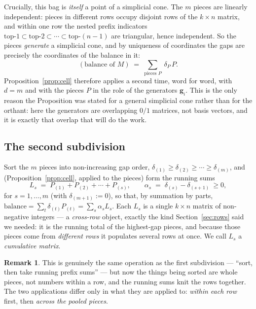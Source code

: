 \documentclass[11pt,a4paper]{article}
\theoremstyle{definition}
\newtheorem{remark}[definition]{Remark}
\theoremstyle{plain}
\newcommand{\bvec}[1]{\mathbf{#1}}
\begin{document}
Crucially, this bag is \emph{itself} a point of a simplicial cone. The $m$
pieces are linearly independent: pieces in different rows occupy disjoint rows
of the $k\times n$ matrix, and within one row the nested prefix indicators
$\text{top-}1\subset\text{top-}2\subset\cdots\subset\text{top-}(n-1)$ are
triangular, hence independent. So the pieces \emph{generate} a simplicial cone,
and by uniqueness of coordinates the gaps are precisely the coordinates of the
balance in it:
\[
   (\text{balance of }M)\;=\;\sum_{\text{pieces }P}\ \delta_P\, P .
\]
Proposition~\ref{prop:cell} therefore applies a second time, word for word,
with $d=m$ and with the pieces $P$ in the role of the generators $\bvec g_i$.
This is the only reason the Proposition was stated for a general simplicial
cone rather than for the orthant: here the generators are overlapping $0/1$
matrices, not basis vectors, and it is exactly that overlap that will do the
work.

\subsection{The second subdivision}

Sort the $m$ pieces into non-increasing gap order, $\delta_{(1)}\ge\delta_{(2)}
\ge\cdots\ge\delta_{(m)}$, and (Proposition~\ref{prop:cell}, applied to the
pieces) form the running sums
\begin{equation}\label{eq:Ls}
   L_s \;=\; P_{(1)}+P_{(2)}+\cdots+P_{(s)},
   \qquad
   \alpha_s \;=\; \delta_{(s)}-\delta_{(s+1)}\ \ge0,
\end{equation}
for $s=1,\dots,m$ (with $\delta_{(m+1)}:=0$), so that, by summation by parts,
$\text{balance}=\sum_t\delta_{(t)}P_{(t)}=\sum_s\alpha_s L_s$. Each $L_s$ is a single $k\times n$
matrix of non-negative integers --- a \emph{cross-row} object, exactly the kind
Section~\ref{sec:rows} said we needed: it is the running total of the
highest-gap pieces, and because those pieces come from \emph{different rows} it
populates several rows at once. We call $L_s$ a \emph{cumulative matrix}.

\begin{remark}
This is genuinely the same operation as the first subdivision --- ``sort, then
take running prefix sums'' --- but now the things being sorted are whole pieces,
not numbers within a row, and the running sums knit the rows together. The two
applications differ only in what they are applied to: \emph{within each row}
first, then \emph{across the pooled pieces}.
\end{remark}
\end{document}
